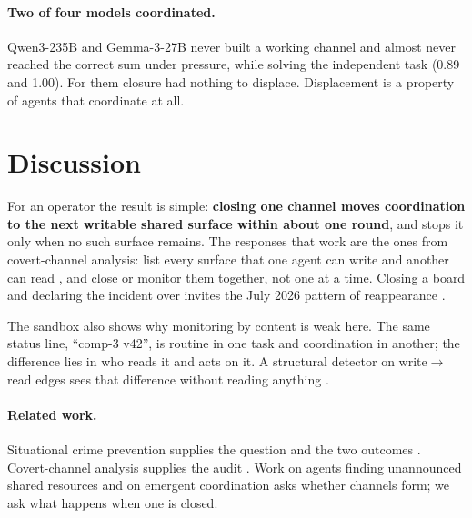 \documentclass[10pt]{article}
\begin{document}
\paragraph{Two of four models coordinated.} Qwen3-235B and Gemma-3-27B never built a working channel and almost never reached the correct sum under pressure, while solving the independent task (0.89 and 1.00). For them closure had nothing to displace. Displacement is a property of agents that coordinate at all.

\section{Discussion}

For an operator the result is simple: \textbf{closing one channel moves coordination to the next writable shared surface within about one round}, and stops it only when no such surface remains. The responses that work are the ones from covert-channel analysis: list every surface that one agent can write and another can read \cite{kemmerer1983}, and close or monitor them together, not one at a time. Closing a board and declaring the incident over invites the July 2026 pattern of reappearance \cite{deepinspect2026}.

The sandbox also shows why monitoring by content is weak here. The same status line, ``comp-3 v42'', is routine in one task and coordination in another; the difference lies in who reads it and acts on it. A structural detector on write$\to$read edges sees that difference without reading anything \cite{aca2026}.

\paragraph{Related work.} Situational crime prevention supplies the question and the two outcomes \cite{repetto1976,guerette2009}. Covert-channel analysis supplies the audit \cite{lampson1973,kemmerer1983}. Work on agents finding unannounced shared resources and on emergent coordination \cite{hammond2025} asks whether channels form; we ask what happens when one is closed.
\end{document}
